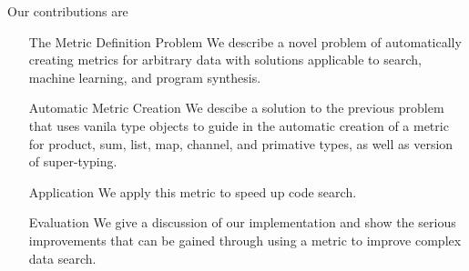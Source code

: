 Our contributions are 

\begin{itemize}
    \item[The Metric Definition Problem] 
    We describe a novel problem of automatically creating metrics for arbitrary data
    with solutions applicable to search, machine learning, and program synthesis.
    \item[Automatic Metric Creation]
    We descibe a solution to the previous problem that uses vanila type objects
    to guide in the automatic creation of a metric for product, sum, list, map, channel, and primative types,
    as well as version of super-typing.
    \item[Application]
    We apply this metric to speed up code search.
    \item[Evaluation]
    We give a discussion of our implementation and show the serious improvements that can be gained through using 
    a metric to improve complex data search.
\end{itemize}